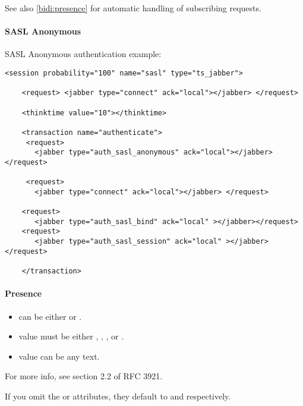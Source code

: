 \documentclass{TSUNG-en}
\begin{document}
See also \ref{bidi:presence} for automatic handling of  subscribing requests.


\paragraph{SASL Anonymous}

SASL Anonymous authentication example:
\begin{Verbatim}
<session probability="100" name="sasl" type="ts_jabber">

    <request> <jabber type="connect" ack="local"></jabber> </request>

    <thinktime value="10"></thinktime>

    <transaction name="authenticate">
     <request>
       <jabber type="auth_sasl_anonymous" ack="local"></jabber></request>

     <request>
       <jabber type="connect" ack="local"></jabber> </request>

    <request>
       <jabber type="auth_sasl_bind" ack="local" ></jabber></request>
    <request>
       <jabber type="auth_sasl_session" ack="local" ></jabber></request>

    </transaction>
\end{Verbatim}


\paragraph{Presence}
\begin{itemize}
\item {} can be either  or .
\item {} value must be either , , , or .
\item {} value can be any text.
\end{itemize}
For more info, see section 2.2 of RFC 3921.

If you omit the  or  attributes, they default to  and  respectively.
\end{document}

